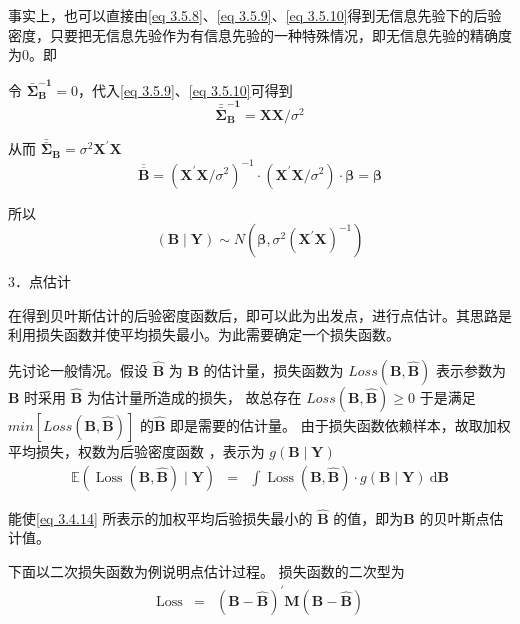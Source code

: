 		  事实上，也可以直接由\ref{eq 3.5.8}、\ref{eq 3.5.9}、\ref{eq 3.5.10}得到无信息先验下的后验密度，只要把无信息先验作为有信息先验的一种特殊情况，即无信息先验的精确度为0。即
		  
		  令 $ \boldsymbol{\bar{\Sigma}_{B}^{-1}} = 0 $，代入\ref{eq 3.5.9}、\ref{eq 3.5.10}可得到
		  $$ \boldsymbol{\bar{\bar{\Sigma}}_{B}^{-1}}  = \boldsymbol{X} \boldsymbol{X} / \sigma^{2} $$
		  
		  从而 $ \boldsymbol{\bar{\bar{\Sigma}}_{B}} = \sigma^{2} \boldsymbol{X^{\prime} \mathbf{X}} $
		  $$ \boldsymbol{\overline{\overline{B}}} = \left(\boldsymbol{X}^{\prime} \boldsymbol{X} / \sigma^{2}\right)^{-1} \cdot
		   \left(\boldsymbol{X}^{\prime} \boldsymbol{X} / \sigma^{2}\right) \cdot \boldsymbol{\beta = \beta} $$
		  
		  所以 
		  $$ (\boldsymbol{B \mid Y}) \sim N\left(\boldsymbol{\beta}, \sigma^{2}\left(\boldsymbol{X^{\prime} X}\right)^{-1}\right) $$
		  
		  
		  3．点估计
		  
		  在得到贝叶斯估计的后验密度函数后，即可以此为出发点，进行点估计。其思路是利用损失函数并使平均损失最小。为此需要确定一个损失函数。
		  
		  先讨论一般情况。假设 $ \boldsymbol{\hat{B}} $ 为 $ \boldsymbol{B} $  的估计量，损失函数为 $ Loss (\boldsymbol{ B , \hat{B}}) $ 
		  表示参数为 $ \boldsymbol{B} $ 时采用 $ \boldsymbol{\hat{B}} $  为估计量所造成的损失， 故总存在 $ Loss ( \boldsymbol{B , \hat{B}}) \ge 0$ 
		  于是满足$ min [ Loss (\boldsymbol{B , \hat{B}})  ]  $ 的$ \boldsymbol{\hat{B}} $  即是需要的估计量。
		  由于损失函数依赖样本，故取加权平均损失，权数为后验密度函数 ，表示为 $ g(\boldsymbol{B \mid Y}) $
		  \begin{eqnarray}
		 	 \mathbb{E} (\operatorname{Loss}(\boldsymbol{B, \hat{B}}) \mid \boldsymbol{Y}) & = & \int \operatorname{Loss}(\boldsymbol{B, \hat{B}}) \cdot
			   g(\boldsymbol{B \mid Y}) ~ \mathrm{d} \boldsymbol{B}
		  	\label{eq 3.4.14}
		  \end{eqnarray}
		  
		  能使\ref{eq 3.4.14} 所表示的加权平均后验损失最小的 $ \boldsymbol{\hat{B}} $ 的值，即为$ \boldsymbol{B} $ 的贝叶斯点估计值。
		  
		  下面以二次损失函数为例说明点估计过程。
		  损失函数的二次型为
		  \begin{eqnarray}
		  \mathrm{Loss}  & = & \boldsymbol{(B-\hat{B})^{\prime}} \boldsymbol{M(B-\hat{B})}
		  \end{eqnarray}
		  
